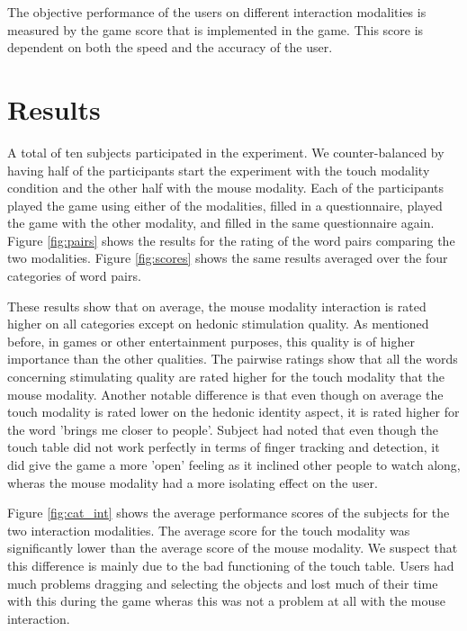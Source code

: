 \documentclass[a4paper,10pt]{report}
\begin{document}
The objective performance of the users on different interaction modalities is measured by the game score that is implemented in the game.
This score is dependent on both the speed and the accuracy of the user.

\chapter{Results}
\label{chap:results}

A total of ten subjects participated in the experiment. We counter-balanced by having half of the participants start the experiment with the touch modality condition and the other half with the mouse modality. Each of the participants played the game using either of the modalities, filled in a questionnaire, played the game with the other modality, and filled in the same questionnaire again. Figure \ref{fig:pairs} shows the results for the rating of the word pairs comparing the two modalities. Figure \ref{fig:scores} shows the same results averaged over the four categories of word pairs. 

These results show that on average, the mouse modality interaction is rated higher on all categories except on hedonic stimulation quality. As mentioned before, in games or other entertainment purposes, this quality is of higher importance than the other qualities. The pairwise ratings show that all the words concerning stimulating quality are rated higher for the touch modality that the mouse modality. Another notable difference is that even though on average the touch modality is rated lower on the hedonic identity aspect, it is rated higher for the word 'brings me closer to people'. Subject had noted that even though the touch table did not work perfectly in terms of finger tracking and detection, it did give the game a more 'open' feeling as it inclined other people to watch along, wheras the mouse modality had a more isolating effect on the user. 

Figure \ref{fig:cat_int} shows the average performance scores of the subjects for the two interaction modalities. The average score for the touch modality was significantly lower than the average score of the mouse modality. We suspect that this difference is mainly due to the bad functioning of the touch table. Users had much problems dragging and selecting the objects and lost much of their time with this during the game wheras this was not a problem at all with the mouse interaction.  
\end{document}
